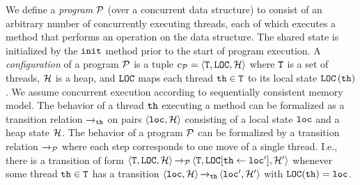 We define a {\em program} ${\mathcal P}$ (over a concurrent data structure) to consist 
of an arbitrary number of concurrently executing threads, each of which
executes a method
that performs an operation on the data structure.
The shared state is initialized
by the $\tt init$ method prior to the start of program execution.
A {\it configuration} of a program ${\mathcal P}$ is a tuple
$c_{{\mathcal P}} = \left\langle{\tt T},{\tt LOC},{\mathcal H}\right\rangle$ where
${\tt T}$ is a set of threads,
${\mathcal H}$ is a heap, and ${\tt LOC}$
maps each thread ${\tt th}\in{\tt T}$ to its
local state ${\tt LOC}\left({\tt th}\right)$.
We assume concurrent execution according to sequentially consistent memory
model.
The behavior of a thread ${\tt th}$ executing a method can be formalized as 
a transition relation ${\xrightarrow{}{}}_{\!\!{\tt th}}$
on pairs $\left\langle{\tt loc},{\mathcal H}\right\rangle$ consisting of a local state
${\tt loc}$ and a heap state ${\mathcal H}$.
The behavior of a program ${\mathcal P}$ can be formalized by a transition relation
${\xrightarrow{}{}}_{\!\!{\mathcal P}}$ where each step corresponds to one move of a single thread.
I.e., 
there is a transition of form
$\left\langle{\tt T},{\tt LOC},{\mathcal H}\right\rangle
{\xrightarrow{}{}}_{\!\!{\mathcal P}}
\left\langle{\tt T},{\tt LOC}[{\tt th}\leftarrow{\tt loc}'],{\mathcal H}'\right\rangle$
whenever some thread ${\tt th} \in {\tt T}$
has a transition
$\left\langle{\tt loc},{\mathcal H}\right\rangle{\xrightarrow{}{}}_{\!\!{\tt th}}\left\langle{\tt loc}',{\mathcal H}'\right\rangle$
with ${\tt LOC}({\tt th}) = {\tt loc}$.


